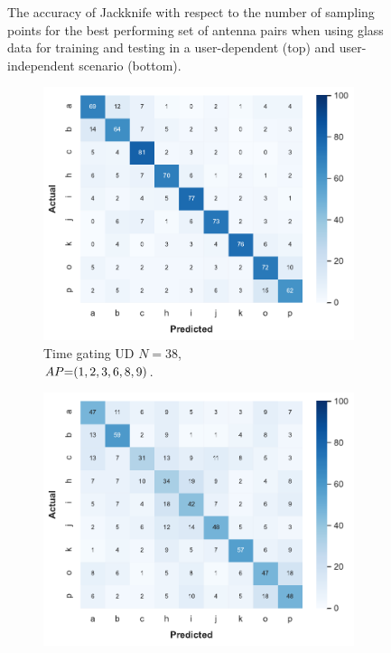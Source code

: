 \begin{figure}[ht]
  \vspace{-6pt}
  \caption{The accuracy of Jackknife with respect to the number of sampling points for the best performing set of antenna pairs when using glass data for training and testing in a user-dependent (top) and user-independent scenario (bottom).}
  \label{fig:radar-experiments:through-materials:glass-samples}
\end{figure}

\begin{figure}[ht]
  \begin{subfigure}{.49\textwidth}
    \centering
    \includegraphics[width=.99\linewidth]{Figures/RadarExperiments/Datasets/ThroughMaterials/Glass/confusion-timegating-ud.pdf}
    \vspace{-15pt}
    \captionsetup{width=.99\linewidth}
    \caption{Time gating UD $N{=}38$, \\ $\splitatcommas{AP{=}(1, 2, 3, 6, 8, 9)}$.}
    \label{fig:radar-experiments:through-materials:glass-confusion:timegating-ud}
  \end{subfigure}
  \begin{subfigure}{.49\textwidth}
    \centering
    \includegraphics[width=.99\linewidth]{Figures/RadarExperiments/Datasets/ThroughMaterials/Glass/confusion-filtering-ud.pdf}

\end{subfigure}
\end{figure}

